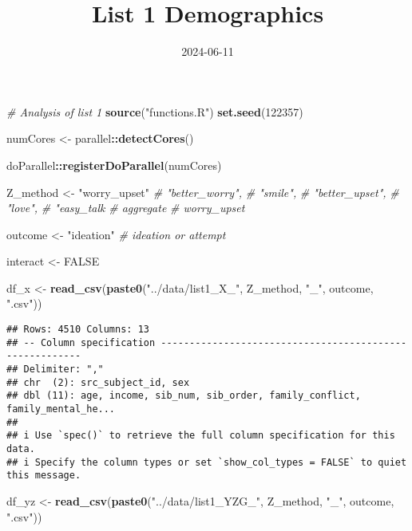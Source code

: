 \documentclass[
]{article}
\title{List 1 Demographics}
\author{}
\date{\vspace{-2.5em}2024-06-11}
\newenvironment{Shaded}{\begin{snugshade}}{\end{snugshade}}
\newcommand{\CommentTok}[1]{\textcolor[rgb]{0.56,0.35,0.01}{\textit{#1}}}
\newcommand{\ConstantTok}[1]{\textcolor[rgb]{0.56,0.35,0.01}{#1}}
\newcommand{\DecValTok}[1]{\textcolor[rgb]{0.00,0.00,0.81}{#1}}
\newcommand{\FunctionTok}[1]{\textcolor[rgb]{0.13,0.29,0.53}{\textbf{#1}}}
\newcommand{\NormalTok}[1]{#1}
\newcommand{\OtherTok}[1]{\textcolor[rgb]{0.56,0.35,0.01}{#1}}
\newcommand{\SpecialCharTok}[1]{\textcolor[rgb]{0.81,0.36,0.00}{\textbf{#1}}}
\newcommand{\StringTok}[1]{\textcolor[rgb]{0.31,0.60,0.02}{#1}}
\begin{document}
\maketitle

\begin{Shaded}
\begin{Highlighting}[]
\CommentTok{\# Analysis of list 1}
\FunctionTok{source}\NormalTok{(}\StringTok{"functions.R"}\NormalTok{)}
\FunctionTok{set.seed}\NormalTok{(}\DecValTok{122357}\NormalTok{)}


\NormalTok{numCores }\OtherTok{\textless{}{-}}\NormalTok{ parallel}\SpecialCharTok{::}\FunctionTok{detectCores}\NormalTok{()}

\NormalTok{doParallel}\SpecialCharTok{::}\FunctionTok{registerDoParallel}\NormalTok{(numCores)}

\NormalTok{Z\_method }\OtherTok{\textless{}{-}} \StringTok{"worry\_upset"}
\CommentTok{\# "better\_worry",}
\CommentTok{\# "smile",}
\CommentTok{\# "better\_upset",}
\CommentTok{\# "love",}
\CommentTok{\# "easy\_talk}
\CommentTok{\# aggregate}
\CommentTok{\# worry\_upset}

\NormalTok{outcome }\OtherTok{\textless{}{-}} \StringTok{"ideation"} \CommentTok{\# ideation or attempt}


\NormalTok{interact }\OtherTok{\textless{}{-}} \ConstantTok{FALSE}

\NormalTok{df\_x }\OtherTok{\textless{}{-}} \FunctionTok{read\_csv}\NormalTok{(}\FunctionTok{paste0}\NormalTok{(}\StringTok{"../data/list1\_X\_"}\NormalTok{, Z\_method, }\StringTok{"\_"}\NormalTok{, outcome, }\StringTok{".csv"}\NormalTok{))}
\end{Highlighting}
\end{Shaded}

\begin{verbatim}
## Rows: 4510 Columns: 13
## -- Column specification --------------------------------------------------------
## Delimiter: ","
## chr  (2): src_subject_id, sex
## dbl (11): age, income, sib_num, sib_order, family_conflict, family_mental_he...
## 
## i Use `spec()` to retrieve the full column specification for this data.
## i Specify the column types or set `show_col_types = FALSE` to quiet this message.
\end{verbatim}

\begin{Shaded}
\begin{Highlighting}[]
\NormalTok{df\_yz }\OtherTok{\textless{}{-}} \FunctionTok{read\_csv}\NormalTok{(}\FunctionTok{paste0}\NormalTok{(}\StringTok{"../data/list1\_YZG\_"}\NormalTok{, Z\_method, }\StringTok{"\_"}\NormalTok{, outcome, }\StringTok{".csv"}\NormalTok{))}
\end{Highlighting}
\end{Shaded}
\end{document}
